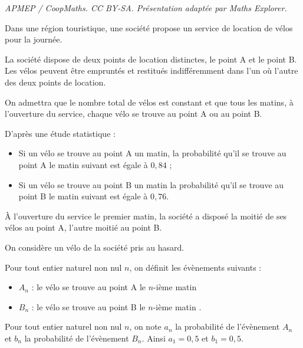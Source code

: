\documentclass[10pt]{article}
\begin{document}
\noindent\textit{APMEP / CoopMaths. CC BY-SA. Présentation adaptée par Maths Explorer.}\par\medskip
\medskip

Dans une région touristique, une société propose un service de location de vélos pour la journée.

\smallskip

La société dispose de deux points de location distinctes, le point A et le point B. Les vélos peuvent être empruntés et restitués indifféremment dans l'un où l'autre des deux points de location.

\smallskip

On admettra que le nombre total de vélos est constant et que tous les matins, à l'ouverture du service, chaque vélo se trouve au point A ou au point B.

\smallskip

D'après une étude statistique :

\smallskip

\setlength\parindent{1cm}
\begin{itemize}
\item[$\bullet~~$] Si un vélo se trouve au point A un matin, la probabilité qu'il se trouve au point A le matin suivant est égale à $0,84$ ;
\item[$\bullet~~$] Si un vélo se trouve au point B un matin la probabilité qu'il se trouve au point B le matin suivant est égale à $0,76$.
\end{itemize}
\setlength\parindent{0cm}

À l'ouverture du service le premier matin, la société a disposé la moitié de ses vélos au point A, l'autre moitié au point B.

\smallskip

On considère un vélo de la société pris au hasard.

\smallskip

Pour tout entier naturel non nul $n$, on définit les évènements suivants :

\setlength\parindent{1cm}
\begin{itemize}
\item[$\bullet~~$]$A_n$ : \og le vélo se trouve au point A le $n$-ième matin \fg{}
\item[$\bullet~~$]$B_n$ : \og le vélo se trouve au point B le $n$-ième matin \fg.
\end{itemize}
\setlength\parindent{0cm}

Pour tout entier naturel non nul $n$, on note $a_n$ la probabilité de l'évènement $A_n$ et $b_n$ la probabilité de l'évènement $B_n$. Ainsi $a_1 = 0,5$ et $b_1 =  0,5$.
\end{document}
